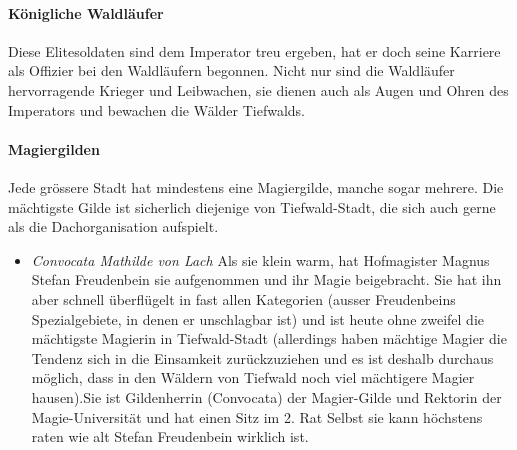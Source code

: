 \documentclass[10pt,twoside,twocolumn,openany]{book}
\begin{document}


\paragraph{Königliche Waldläufer} Diese Elitesoldaten sind dem Imperator treu ergeben, hat er doch seine Karriere als Offizier bei den Waldläufern begonnen. Nicht nur sind die Waldläufer hervorragende Krieger und Leibwachen, sie dienen auch als Augen und Ohren des Imperators und bewachen die Wälder Tiefwalds.

\paragraph{Magiergilden} Jede grössere Stadt hat mindestens eine Magiergilde, manche sogar mehrere. Die mächtigste Gilde ist sicherlich diejenige von Tiefwald-Stadt, die sich auch gerne als die Dachorganisation aufspielt.
\begin{itemize}
	\item\textit{Convocata Mathilde von Lach} Als sie klein warm, hat Hofmagister Magnus Stefan Freudenbein sie aufgenommen und ihr Magie beigebracht. Sie hat ihn aber schnell überflügelt in fast allen Kategorien (ausser Freudenbeins Spezialgebiete, in denen er unschlagbar ist) und ist heute ohne zweifel die mächtigste Magierin in Tiefwald-Stadt (allerdings haben mächtige Magier die Tendenz sich in die Einsamkeit zurückzuziehen und es ist deshalb durchaus möglich, dass in den Wäldern von Tiefwald noch viel mächtigere Magier hausen).Sie ist Gildenherrin (Convocata) der Magier-Gilde und Rektorin der Magie-Universität und hat einen Sitz im 2. Rat
	Selbst sie kann höchstens raten wie alt Stefan Freudenbein wirklich ist.
\end{itemize}
\end{document}
